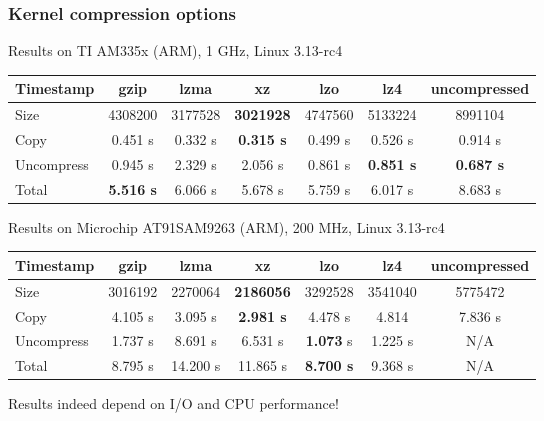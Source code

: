 \begin{frame}
\frametitle{Kernel compression options}
Results on TI AM335x (ARM), 1 GHz, Linux 3.13-rc4
{\fontsize{7}{10}\selectfont
\begin{tabular}{| l || c | c | c | c | c | c |}
\hline
Timestamp & gzip & lzma & xz & lzo & lz4 & uncompressed \\
\hline
Size & 4308200 & 3177528 & {\bf 3021928} & 4747560 & 5133224 & 8991104 \\
Copy & 0.451 s & 0.332 s & {\bf 0.315 s} & 0.499 s & 0.526 s & 0.914 s \\
Uncompress & 0.945 s & 2.329 s & 2.056 s & 0.861 s & {\bf 0.851 s} & {\bf 0.687 s} \\
Total & {\bf 5.516 s} & 6.066 s & 5.678 s & 5.759 s & 6.017 s & 8.683 s \\
\hline
\end{tabular}
}
\vfill{}
Results on Microchip AT91SAM9263 (ARM), 200 MHz, Linux 3.13-rc4
{\fontsize{7}{10}\selectfont
\begin{tabular}{| l || c | c | c | c | c | c |}
\hline
Timestamp & gzip & lzma & xz & lzo & lz4 & uncompressed \\
\hline
Size & 3016192 & 2270064 & {\bf 2186056} & 3292528 & 3541040 & 5775472 \\
Copy & 4.105 s & 3.095 s & {\bf 2.981 s} & 4.478 s & 4.814 & 7.836 s \\
Uncompress & 1.737 s & 8.691 s & 6.531 s & {\bf 1.073} s & 1.225 s & N/A \\
Total & 8.795 s & 14.200 s & 11.865 s & {\bf 8.700 s} & 9.368 s & N/A \\
\hline
\end{tabular}
}
\newline\newline
Results indeed depend on I/O and CPU performance!
\end{frame}

